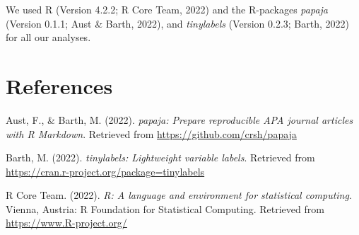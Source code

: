 \documentclass[
  man]{apa6}
\newlength{\cslhangindent}
\newlength{\cslentryspacingunit} %
\newenvironment{CSLReferences}[2] %
 {%
  \setlength{\parindent}{0pt}
  \ifodd #1
  \let\oldpar\par
  \def\par{\hangindent=\cslhangindent\oldpar}
  \fi
  \setlength{\parskip}{#2\cslentryspacingunit}
 }%
 {}
\begin{document}
We used R (Version 4.2.2; R Core Team, 2022) and the R-packages \emph{papaja} (Version 0.1.1; Aust \& Barth, 2022), and \emph{tinylabels} (Version 0.2.3; Barth, 2022) for all our analyses.

\hypertarget{references}{%
\section{References}\label{references}}

\hypertarget{refs}{}
\begin{CSLReferences}{1}{0}
\leavevmode{}%
Aust, F., \& Barth, M. (2022). \emph{{papaja}: {Prepare} reproducible {APA} journal articles with {R Markdown}}. Retrieved from \url{https://github.com/crsh/papaja}

\leavevmode{}%
Barth, M. (2022). \emph{{tinylabels}: Lightweight variable labels}. Retrieved from \url{https://cran.r-project.org/package=tinylabels}

\leavevmode{}%
R Core Team. (2022). \emph{R: A language and environment for statistical computing}. Vienna, Austria: R Foundation for Statistical Computing. Retrieved from \url{https://www.R-project.org/}

\end{CSLReferences}
\end{document}
